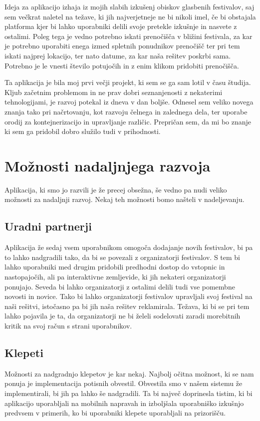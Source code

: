 \documentclass[a4paper,12pt,openright]{book}
\begin{document}
Ideja za aplikacijo izhaja iz mojih slabih izkušenj obiskov glasbenih festivalov, saj sem večkrat naletel na težave, ki jih najverjetneje ne bi nikoli imel, če bi obstajala platforma kjer bi lahko uporabniki delili svoje pretekle izkušnje in nasvete z ostalimi.
Poleg tega je vedno potrebno iskati prenočišča v bližini festivala, za kar je potrebno uporabiti enega izmed spletnih ponudnikov prenočišč ter pri tem iskati najprej lokacijo, ter nato datume, za kar naša rešitev poskrbi sama.
Potrebno je le vnesti število potujočih in z enim klikom pridobiti prenočišča.

Ta aplikacija je bila moj prvi večji projekt, ki sem se ga sam lotil v času študija.
Kljub začetnim problemom in ne prav dobri seznanjenosti z nekaterimi tehnologijami, je razvoj potekal iz dneva v dan boljše.
Odnesel sem veliko novega znanja tako pri načrtovanju, kot razvoju čelnega in zalednega dela, ter uporabe orodij za kontejnerizacijo in upravljanje različic.
Prepričan sem, da mi bo znanje ki sem ga pridobil dobro služilo tudi v prihodnosti.

\section{Možnosti nadaljnjega razvoja}
Aplikacija, ki smo jo razvili je že precej obsežna, še vedno pa nudi veliko možnosti za nadaljnji razvoj.
Nekaj teh možnosti bomo našteli v nadeljevanju.

\subsection{Uradni partnerji}
Aplikacija že sedaj vsem uporabnikom omogoča dodajanje novih festivalov, bi pa to lahko nadgradili tako, da bi se povezali z organizatorji festivalov.
S tem bi lahko uporabniki med drugim pridobili predhodni dostop do vstopnic in nastopajočih, ali pa interaktivne zemljevide, ki jih nekateri organizatorji ponujajo.
Seveda bi lahko organizatorji z ostalimi delili tudi vse pomembne novosti in novice.
Tako bi lahko organizatorji festivalov upravljali svoj festival na naši rešitvi, istočasno pa bi jih naša rešitev reklamirala.
Težava, ki bi se pri tem lahko pojavila je ta, da organizatorji ne bi želeli sodelovati zaradi morebitnih kritik na svoj račun s strani uporabnikov.

\subsection{Klepeti}
Možnosti za nadgradnjo klepetov je kar nekaj.
Najbolj očitna možnost, ki se nam ponuja je implementacija potisnih obvestil.
Obvestila smo v našem sistemu že implementirali, bi jih pa lahko še nadgradili.
Ta bi največ doprinesla tistim, ki bi aplikacijo uporabljali na mobilnih napravah in izboljšala uporabniško izkušnjo predvsem v primerih, ko bi uporabniki klepete uporabljali na prizorišču.
\end{document}
